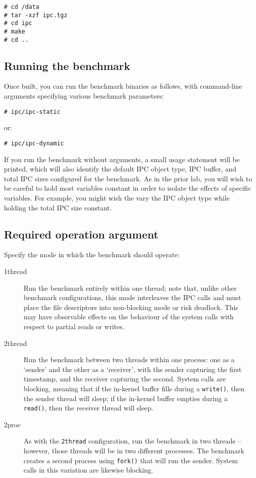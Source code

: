 \documentclass[a4paper,10pt]{article}
\begin{document}
\begin{verbatim}
# cd /data
# tar -xzf ipc.tgz
# cd ipc
# make
# cd ..
\end{verbatim}

\subsection*{Running the benchmark}

Once built, you can run the benchmark binaries as follows, with command-line
arguments specifying various benchmark parameters:

\begin{verbatim}
# ipc/ipc-static
\end{verbatim}

\noindent
or:

\begin{verbatim}
# ipc/ipc-dynamic
\end{verbatim}

If you run the benchmark without arguments, a small usage statement will be
printed, which will also identify the default IPC object type, IPC buffer, and
total IPC sizes configured for the benchmark.
As in the prior lab, you will wish to be careful to hold most variables
constant in order to isolate the effects of specific variables.
For example, you might wish the vary the IPC object type while holding the
total IPC size constant.

\subsection*{Required operation argument}

Specify the mode in which the benchmark should operate:

\begin{description}
\item[1thread] Run the benchmark entirely within one thread; note that, unlike
  other benchmark configurations, this mode interleaves the IPC calls and must
  place the file descriptors into non-blocking mode or risk deadlock.
  This may have observable effects on the behaviour of the system calls with
  respect to partial reads or writes.

\item[2thread] Run the benchmark between two threads within one process: one
  as a `sender' and the other as a `receiver', with the sender capturing the
  first timestamp, and the receiver capturing the second.
  System calls are blocking, meaning that if the in-kernel buffer fills
  during a \texttt{write()}, then the sender thread will sleep; if the
  in-kernel buffer empties during a \texttt{read()}, then the receiver thread
  will sleep.


\item[2proc] As with the \texttt{2thread} configuration, run the benchmark in
  two threads -- however, those threads will be in two different processes.
  The benchmark creates a second process using \texttt{fork()} that will run
  the sender.
  System calls in this variation are likewise blocking.
\end{description}
\end{document}
